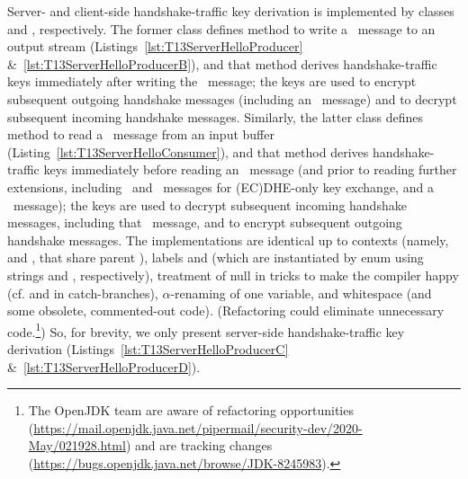 \begin{tcolorbox}
Server- and client-side handshake-traffic key derivation is implemented by classes 
and , %
respectively.
The former class defines method  to write a \ServerHello\ message to an 
output stream (Listings~\ref{lst:T13ServerHelloProducer} 
\&~\ref{lst:T13ServerHelloProducerB}), and that method derives handshake-traffic 
keys immediately after writing the \ServerHello\ message; the keys are used to encrypt subsequent 
outgoing handshake messages (including an \EncryptedExtensions\ message) and to decrypt subsequent
incoming handshake messages. Similarly, the latter class defines 
method  to read a \ServerHello\ message from an input buffer 
(Listing~\ref{lst:T13ServerHelloConsumer}), and that method derives handshake-traffic 
keys immediately before reading an \EncryptedExtensions\ message (and prior to reading 
further extensions, including \Certificate\ and \CertificateVerify\ messages 
for (EC)DHE-only key exchange, and a \Finished\ message); the keys are used to decrypt subsequent
incoming handshake messages, including that \EncryptedExtensions\ message, and to encrypt subsequent
outgoing handshake messages.
The implementations 
are identical up to contexts (namely,  and 
, that share parent ), 
labels 
{\textvisiblespace{}\textvisiblespace{}} and 
{\textvisiblespace{}\textvisiblespace{}}
(which are instantiated by enum 
using strings  and 
, respectively), treatment of null
in tricks to make the compiler happy (cf.  and 
in catch-branches), $\alpha$-renaming of one variable, and whitespace
(and some obsolete, commented-out code). 
(Refactoring could eliminate unnecessary code.\footnote{%
  The OpenJDK team are aware of refactoring opportunities 
  (\url{https://mail.openjdk.java.net/pipermail/security-dev/2020-May/021928.html})
  and are tracking changes (\url{https://bugs.openjdk.java.net/browse/JDK-8245983}).
}) 
So, for brevity, we only present server-side handshake-traffic key derivation 
(Listings~\ref{lst:T13ServerHelloProducerC} \&~\ref{lst:T13ServerHelloProducerD}). 
%
%
\begin{comment}
Derivation is dependent on \TLSEarlySecret\ and 
the negotiated (EC)DHE key (PSK-only key exchange is unsupported), 
which are computed by classes \code{DHKeyExchange.DHEKAGenerator.DHEKAKeyDerivation} and
\code{ECDHKeyExchange.ECDHEKAKeyDerivation}. Those classes
are identical up to constructor names, strings \code{"DiffieHellman"}
and \code{"ECDH"}, and whitespace. (Refactoring could elimate
unnecessary code.) So, for brevity, we only present the 
former class (Listing~\ref{lst:DHEKAKeyDerivation}).
\end{comment}


\end{tcolorbox}
